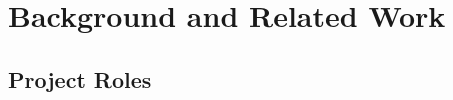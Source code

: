 \documentclass[sigconf]{acmart}
\theoremstyle{break}
\begin{document}





\section{Background and Related Work}
\label{sec:literature}

\subsection{Project Roles}
\label{sec:hero}
\end{document}
